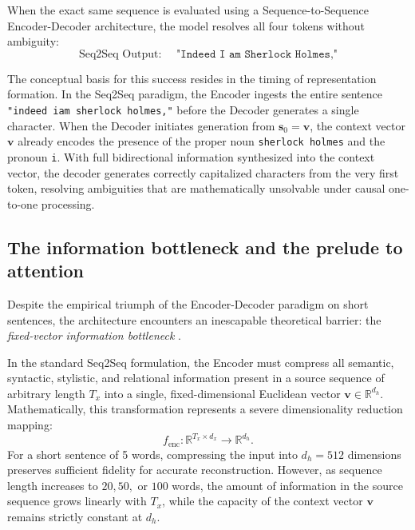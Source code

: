 \documentclass[../../main.tex]{subfiles}
\begin{document}
When the exact same sequence is evaluated using a Sequence-to-Sequence Encoder-Decoder architecture, the model resolves all four tokens without ambiguity:
\begin{equation}
\text{Seq2Seq Output: } \quad \texttt{"Indeed I am Sherlock Holmes,"}
\end{equation}

The conceptual basis for this success resides in the timing of representation formation. In the Seq2Seq paradigm, the Encoder ingests the entire sentence \texttt{"indeed iam sherlock holmes,"} before the Decoder generates a single character. When the Decoder initiates generation from $\mathbf{s}_0 = \mathbf{v}$, the context vector $\mathbf{v}$ already encodes the presence of the proper noun \texttt{sherlock holmes} and the pronoun \texttt{i}. With full bidirectional information synthesized into the context vector, the decoder generates correctly capitalized characters from the very first token, resolving ambiguities that are mathematically unsolvable under causal one-to-one processing.

\subsection{The information bottleneck and the prelude to attention}
\label{subsec:rnn_information_bottleneck}

Despite the empirical triumph of the Encoder-Decoder paradigm on short sentences, the architecture encounters an inescapable theoretical barrier: the \textit{fixed-vector information bottleneck} \citep{bahdanau2014}.

In the standard Seq2Seq formulation, the Encoder must compress all semantic, syntactic, stylistic, and relational information present in a source sequence of arbitrary length $T_x$ into a single, fixed-dimensional Euclidean vector $\mathbf{v} \in \mathbb{R}^{d_h}$. Mathematically, this transformation represents a severe dimensionality reduction mapping:
\begin{equation}
f_{\text{enc}}: \mathbb{R}^{T_x \times d_x} \longrightarrow \mathbb{R}^{d_h}.
\end{equation}
For a short sentence of 5 words, compressing the input into $d_h = 512$ dimensions preserves sufficient fidelity for accurate reconstruction. However, as sequence length increases to $20, 50,$ or $100$ words, the amount of information in the source sequence grows linearly with $T_x$, while the capacity of the context vector $\mathbf{v}$ remains strictly constant at $d_h$.
\end{document}
